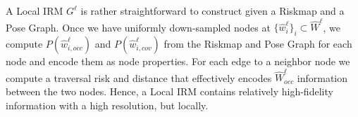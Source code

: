 \documentclass[letterpaper]{article} %
\newcommand{\phdone}[1]{} %
\begin{document}
\phdone{Local IRM}
%
A Local IRM $G^\ell$ is rather straightforward to construct given a Riskmap and a Pose Graph.
Once we have uniformly down-sampled nodes at $\{\hat{w}^\ell_i\}_i \subset \hat{W}^\ell$,
we compute $P(\hat{w}^\ell_{i,occ})$ and $P(\hat{w}^\ell_{i,cov})$ from the Riskmap and Pose Graph for each node and encode them as node properties.
For each edge to a neighbor node we compute a traversal risk and distance that effectively encodes $\hat{W}^\ell_{occ}$ information between the two nodes.
Hence, a Local IRM contains relatively high-fidelity information with a high resolution, but locally.







\end{document}
